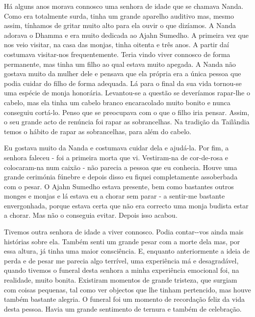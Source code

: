 Há alguns anos morava connosco uma senhora de idade que se chamava
Nanda. Como era totalmente surda, tinha um grande aparelho auditivo mas,
mesmo assim, tínhamos de gritar muito alto para ela ouvir o que
dizíamos. A Nanda adorava o Dhamma e era muito dedicada ao Ajahn
Sumedho. A primeira vez que nos veio visitar, na casa das monjas, tinha
oitenta e três anos. A partir daí costumava visitar-nos frequentemente.
Teria vindo viver connosco de forma permanente, mas tinha um filho ao
qual estava muito apegada. A Nanda não gostava muito da mulher dele e
pensava que ela própria era a única pessoa que podia cuidar do filho de
forma adequada. Lá para o final da sua vida \mbox{tornou-se} uma espécie de
monja honorária. Levantou-se a questão se deveríamos rapar-lhe o cabelo,
mas ela tinha um cabelo branco encaracolado muito bonito e nunca
conseguiu cortá-lo. Penso que se preocupava com o que o filho iria
pensar. Assim, o seu grande acto de renúncia foi rapar as sobrancelhas.
Na tradição da Tailândia temos o hábito de rapar as sobrancelhas, para
além do cabelo.

Eu gostava muito da Nanda e costumava cuidar dela e \mbox{ajudá-la}. Por fim, a
senhora faleceu - foi a primeira morta que vi. \mbox{Vestiram-na} de
cor-de-rosa e colocaram-na num caixão - não parecia a pessoa que eu
conhecia. Houve uma grande cerimónia fúnebre e depois disso eu fiquei
completamente assoberbada com o pesar. O Ajahn Sumedho estava presente,
bem como bastantes outros monges e monjas e lá estava eu a chorar sem
parar - a sentir-me bastante envergonhada, porque estava certa que não
era correcto uma monja budista estar a chorar. Mas não o conseguia
evitar. Depois isso acabou.

Tivemos outra senhora de idade a viver connosco. Podia contar-\linebreak-vos ainda
mais histórias sobre ela. Também senti um grande pesar com a morte dela
mas, por essa altura, já tinha uma maior consciência. E, enquanto
anteriormente a ideia de perda e de pesar me parecia algo terrível, uma
experiência má e desagradável, quando tivemos o funeral desta senhora a
minha experiência emocional foi, na realidade, muito bonita. Existiram
momentos de grande tristeza, que surgiam com coisas pequenas, tal como
ver objectos que lhe tinham pertencido, mas houve também bastante
alegria. O funeral foi um momento de recordação feliz da vida desta
pessoa. Havia um grande sentimento de ternura e também de celebração.

